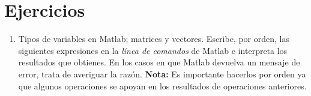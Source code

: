 \section{Ejercicios}
\begin{enumerate}
\item Tipos de variables en Matlab; matrices y vectores. Escribe, por orden, las siguientes expresiones en la \emph{línea de comandos} de Matlab e interpreta los resultados que obtienes. En los casos en que Matlab devuelva un mensaje de error, trata de averiguar la razón. \textbf{Nota:} Es importante hacerlos por orden ya que algunos operaciones se apoyan en los resultados de operaciones anteriores.
\begin{multicols}{2}
\end{multicols}
\end{enumerate}
